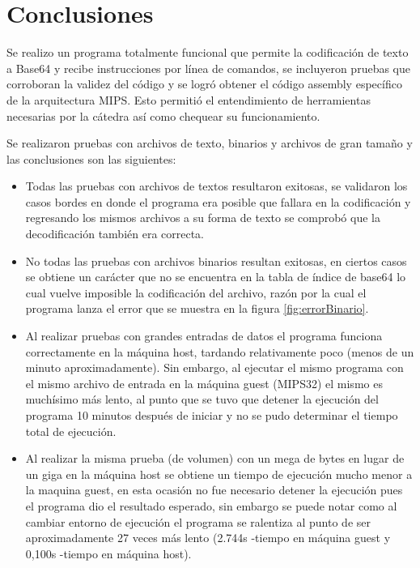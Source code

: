 \documentclass[titlepage,a4paper]{article}
\begin{document}
\section{Conclusiones}

Se realizo un programa totalmente funcional que permite la codificación de texto a Base64 y recibe instrucciones por línea de comandos, se incluyeron pruebas que corroboran la validez del código y se logró obtener el código assembly específico de la arquitectura MIPS. Esto permitió el entendimiento de herramientas necesarias por la cátedra así como chequear su funcionamiento. \newline

Se realizaron pruebas con archivos de texto, binarios y archivos de gran tamaño y las conclusiones son las siguientes:
\begin{itemize}
    \item Todas las pruebas con archivos de textos resultaron exitosas, se validaron los casos bordes en donde el programa era posible que fallara en la codificación y regresando los mismos archivos a su forma de texto se comprobó que la decodificación también era correcta.
    
    \item No todas las pruebas con archivos binarios resultan exitosas, en ciertos casos se obtiene un carácter que no se encuentra en la tabla de índice de base64 lo cual vuelve imposible la codificación del archivo, razón por la cual el programa lanza el error que se muestra en la figura \ref{fig:errorBinario}.
    
    \item Al realizar pruebas con grandes entradas de datos el programa funciona correctamente en la máquina host, tardando relativamente poco (menos de un minuto aproximadamente). Sin embargo, al ejecutar el mismo programa con el mismo archivo de entrada en la máquina guest (MIPS32) el mismo es muchísimo más lento, al punto que se tuvo que detener la ejecución del programa 10 minutos después de iniciar y no se pudo determinar el tiempo total de ejecución.
    
    \item Al realizar la misma prueba (de volumen) con un mega de bytes en lugar de un giga en la máquina host se obtiene un tiempo de ejecución mucho menor a la maquina guest, en esta ocasión no fue necesario detener la ejecución pues el programa dio el resultado esperado, sin embargo se puede notar como al cambiar entorno de ejecución el programa se ralentiza al punto de ser aproximadamente 27 veces más lento (2.744s -tiempo en máquina guest y 0,100s -tiempo en máquina host).
    
\end{itemize}
\end{document}
